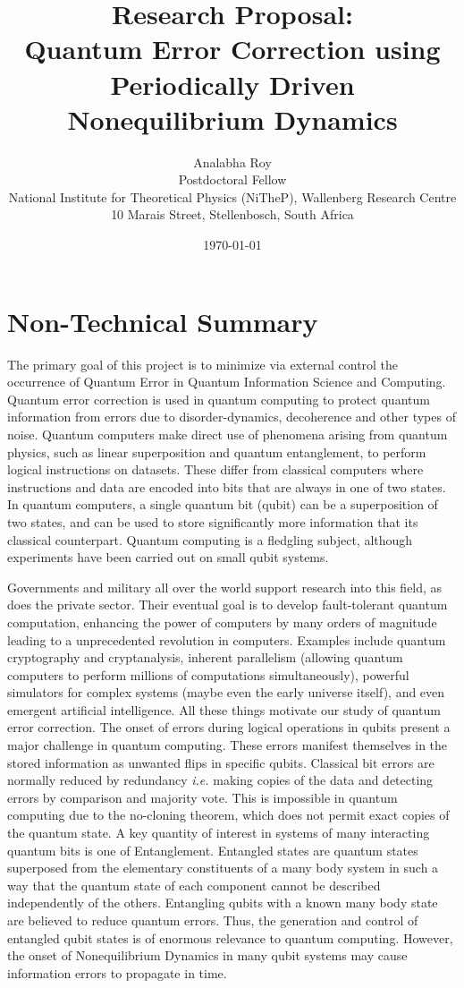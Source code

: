 \documentclass[a4paper,9pt]{article}
\title{Research Proposal:\\ Quantum Error Correction using Periodically Driven Nonequilibrium Dynamics }
\author{Analabha Roy\\Postdoctoral Fellow\\National Institute for Theoretical Physics (NiTheP), Wallenberg Research Centre\\10 Marais Street, Stellenbosch, South Africa}
\date{\today}
\begin{document}
 \maketitle
\section{Non-Technical Summary}
The primary goal of this project is to minimize via external control the occurrence of Quantum Error in Quantum Information Science and Computing. Quantum error correction is used in quantum computing to protect quantum information from errors due to disorder-dynamics, decoherence and other types of noise. Quantum computers make direct use of phenomena arising from quantum physics, such as linear superposition and quantum entanglement, to perform logical instructions on datasets. These differ from classical computers where instructions and data are encoded into bits that are always in one of two states. In quantum computers, a single quantum bit (qubit) can be a superposition of two states, and can be used to store significantly more information that its classical counterpart. Quantum computing is a fledgling subject, although experiments have been carried out on small qubit systems.

Governments and military all over the world support research into this field, as does the private sector. Their eventual goal is to develop fault-tolerant quantum computation, enhancing the power of computers by many orders of magnitude leading to a unprecedented revolution in computers. Examples include quantum cryptography and cryptanalysis, inherent parallelism (allowing quantum computers to perform millions of computations simultaneously), powerful simulators for complex systems (maybe even the early universe itself), and even emergent artificial intelligence. All these things motivate our study of quantum error correction.  The onset of errors during logical operations in qubits present a major challenge in quantum computing. These errors manifest themselves in the stored information as unwanted flips in specific qubits. Classical bit errors are normally reduced by redundancy \textit{i.e.} making copies of the data and detecting errors by comparison and majority vote. This is impossible in quantum computing due to the no-cloning theorem, which does not permit exact copies of the quantum state.  A key quantity of interest in systems of many interacting quantum bits is one of Entanglement. Entangled states are quantum states superposed from the elementary constituents of a many body system in such a way that the quantum state of each component cannot be described independently of the others. Entangling qubits with a known many body state are believed to reduce quantum errors.  Thus, the generation and control of entangled qubit states is of enormous relevance to quantum computing. However, the onset of Nonequilibrium Dynamics in many qubit systems may cause information errors to propagate in time.
\end{document}
